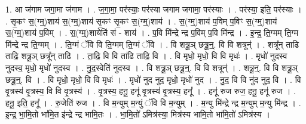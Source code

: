 \documentclass[17pt]{extarticle}
\begin{document}
1. आ ज॑गाम जगा॒मा ज॑गाम । . ज॒गा॒मा॒ पर॑स्याः॒ पर॑स्या जगाम जगामा॒ पर॑स्याः । . पर॑स्या॒ इति॒ पर॑स्याः । . सृ॒कꣳ स॒(ग्म्॒)शाय॑ स॒(ग्म्॒)शाय॑ सृ॒कꣳ सृ॒कꣳ स॒(ग्म्॒)शाय॑ । . स॒(ग्म्॒)शाय॑ प॒विम् प॒विꣳ स॒(ग्म्॒)शाय॑ स॒(ग्म्॒)शाय॑ प॒विम् । . स॒(ग्म्॒)शायेति॑ सं - शाय॑ । . प॒वि मि॑न्द्रे न्द्र प॒विम् प॒वि मि॑न्द्र । . इ॒न्द्र॒ ति॒ग्मम् ति॒ग्म मि॑न्द्रे न्द्र ति॒ग्मम् । . ति॒ग्मं ॅवि वि ति॒ग्मम् ति॒ग्मं ॅवि । . वि शत्रू॒ञ् छत्रू॒न्॒. वि वि शत्रून्॑ । . शत्रू᳚न् ताढि ताढि॒ शत्रू॒ञ् छत्रू᳚न् ताढि । . ता॒ढि॒ वि वि ता॑ढि ताढि॒ वि । . वि मृधो॒ मृधो॒ वि वि मृधः॑ । . मृधो॑ नुदस्व नुदस्व॒ मृधो॒ मृधो॑ नुदस्व । . नु॒द॒स्वेति॑ नुदस्व । . वि शत्रू॒ञ् छत्रू॒न्॒. वि वि शत्रून्॑ । . शत्रू॒न्॒. वि वि शत्रू॒ञ् छत्रू॒न्॒. वि । . वि मृधो॒ मृधो॒ वि वि मृधः॑ । . मृधो॑ नुद नुद॒ मृधो॒ मृधो॑ नुद । . नु॒द॒ वि वि नु॑द नुद॒ वि । . वि वृ॒त्रस्य॑ वृ॒त्रस्य॒ वि वि वृ॒त्रस्य॑ । . वृ॒त्रस्य॒ हनू॒ हनू॑ वृ॒त्रस्य॑ वृ॒त्रस्य॒ हनू᳚ । . हनू॑ रुज रुज॒ हनू॒ हनू॑ रुज । . हनू॒ इति॒ हनू᳚ । . रु॒जेति॑ रुज । . वि म॒न्युम् म॒न्युं ॅवि वि म॒न्युम् । . म॒न्यु मि॑न्द्रे न्द्र म॒न्युम् म॒न्यु मि॑न्द्र । . इ॒न्द्र॒ भा॒मि॒तो भा॑मि॒त इ॑न्द्रे न्द्र भामि॒तः । . भा॒मि॒तो॑ ऽमित्र॑स्या॒ मित्र॑स्य भामि॒तो भा॑मि॒तो॑ ऽमित्र॑स्य । \newline
\end{document}

